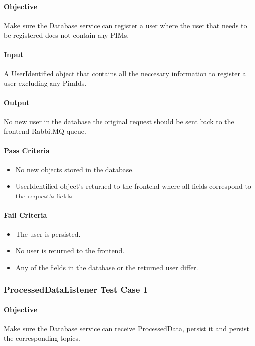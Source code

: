 \documentclass[hidelinks,english]{article}
\begin{document}
				\paragraph{Objective} Make sure the Database service can register a user where the user that needs to be registered does not contain any PIMs.
				\paragraph{Input} A UserIdentified object that contains all the neccesary information to register a user excluding any PimIds.
				\paragraph{Output} No new user in the database the original request should be sent back to the frontend RabbitMQ queue.
				\paragraph{Pass Criteria}
				\begin{itemize}
					\item No new objects stored in the database.
					\item UserIdentified object's returned to the frontend where all fields correspond to the request's fields.
				\end{itemize}
				\paragraph{Fail Criteria}
				\begin{itemize}
					\item The user is persisted.
					\item No user is returned to the frontend.
					\item Any of the fields in the database or the returned user differ.
				\end{itemize}
				
		\subsubsection{ProcessedDataListener Test Case 1}\label{databaseprocesseddatalistenertest1}
			\paragraph{Objective} Make sure the Database service can receive ProcessedData, persist it and persist the corresponding topics.
\end{document}
